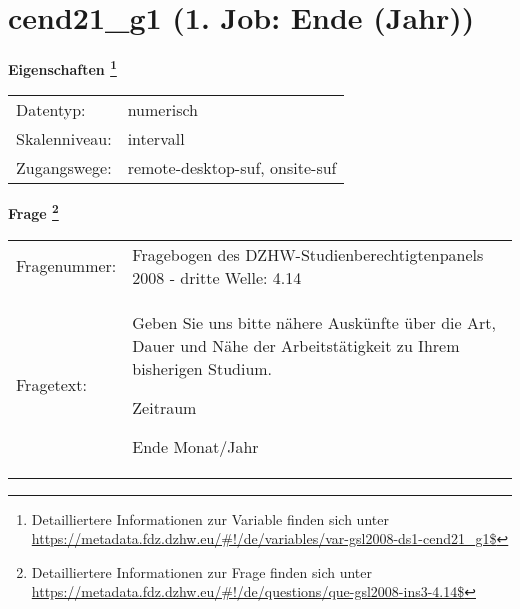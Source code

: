 
    \setcounter{footnote}{0}

    \vspace*{-1.8cm}
	\section{cend21\_g1 (1. Job: Ende (Jahr))}
	\label{section:cend21_g1}



    \vspace*{0.5cm}
    \noindent\textbf{Eigenschaften
	\footnote{Detailliertere Informationen zur Variable finden sich unter
		\url{https://metadata.fdz.dzhw.eu/\#!/de/variables/var-gsl2008-ds1-cend21_g1$}}}\\
	\begin{tabularx}{\hsize}{@{}lX}
	Datentyp: & numerisch \\
	Skalenniveau: & intervall \\
	Zugangswege: &
	  remote-desktop-suf, 
	  onsite-suf
 \\
    \end{tabularx}



				\vspace*{0.5cm}
                \noindent\textbf{Frage
	                \footnote{Detailliertere Informationen zur Frage finden sich unter
		              \url{https://metadata.fdz.dzhw.eu/\#!/de/questions/que-gsl2008-ins3-4.14$}}}\\
				\begin{tabularx}{\hsize}{@{}lX}
					Fragenummer: &
					  Fragebogen des DZHW-Studienberechtigtenpanels 2008 - dritte Welle:
					  4.14
 \\
					Fragetext: & Geben Sie uns bitte nähere Auskünfte über die Art, Dauer und Nähe der Arbeitstätigkeit zu Ihrem bisherigen Studium.\par  Zeitraum\par  Ende Monat/Jahr \\
				\end{tabularx}





